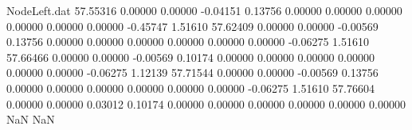 \begin{filecontents}{NodeLeft.dat}
  57.55316    0.00000    0.00000    -0.04151    0.13756    0.00000    0.00000    0.00000    0.00000    0.00000    0.00000   -0.45747    1.51610
  57.62409    0.00000    0.00000    -0.00569    0.13756    0.00000    0.00000    0.00000    0.00000    0.00000    0.00000   -0.06275    1.51610
  57.66466    0.00000    0.00000    -0.00569    0.10174    0.00000    0.00000    0.00000    0.00000    0.00000    0.00000   -0.06275    1.12139
  57.71544    0.00000    0.00000    -0.00569    0.13756    0.00000    0.00000    0.00000    0.00000    0.00000    0.00000   -0.06275    1.51610
  57.76604    0.00000    0.00000     0.03012    0.10174    0.00000    0.00000    0.00000    0.00000    0.00000    0.00000        NaN        NaN
\end{filecontents}
